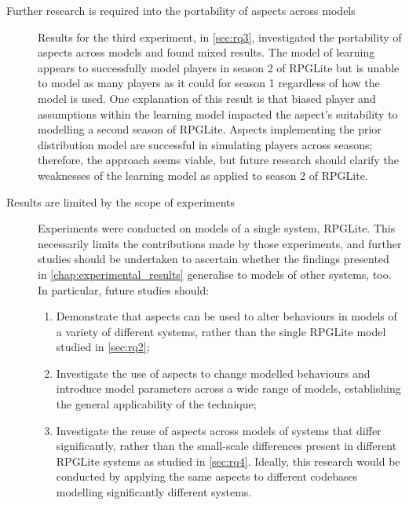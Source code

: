 \begin{description}
  \item[Further research is required into the portability of aspects across
  models] Results for the third experiment, in \cref{sec:rq3}, investigated the
  portability of aspects across models and found mixed results. The model of
  learning appears to successfully model players in season 2 of RPGLite but is
  unable to model as many players as it could for season 1 regardless of how the
  model is used. One explanation of this result is that biased player and
  assumptions within the learning model impacted the aspect's suitability to
  modelling a second season of RPGLite. Aspects implementing the prior
  distribution model are successful in simulating players across seasons;
  therefore, the approach seems viable, but future research should clarify the
  weaknesses of the learning model as applied to season 2 of RPGLite. 

  \item[Results are limited by the scope of experiments] Experiments were
  conducted on models of a single system, RPGLite. This necessarily limits the
  contributions made by those experiments, and further studies should be
  undertaken to ascertain whether the findings presented in
  \cref{chap:experimental_results} generalise to models of other systems, too.
  In particular, future studies should:
  \begin{enumerate}
    \item Demonstrate that aspects can be used to alter behaviours in models of
    a variety of different systems, rather than the single RPGLite model studied
    in \cref{sec:rq2};
    \item Investigate the use of aspects to change modelled behaviours and
    introduce model parameters across a wide range of models, establishing the
    general applicability of the technique;
    \item Investigate the reuse of aspects across models of systems that differ
    significantly, rather than the small-scale differences present in different
    RPGLite systems as studied in \cref{sec:rq4}. Ideally, this research would
    be conducted by applying the same aspects to different codebases modelling
    significantly different systems.
  \end{enumerate}
\end{description}




\section{\thesistitle}


